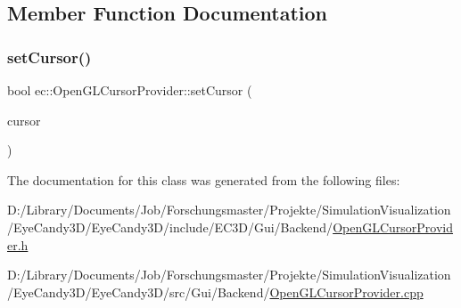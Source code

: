 \subsection{Member Function Documentation}
\mbox{\label{classec_1_1_open_g_l_cursor_provider_a1eadfdfdfeaac9f932bad8e16edfab3b}} 
\subsubsection{\texorpdfstring{set\+Cursor()}{setCursor()}}
{\footnotesize\ttfamily bool ec\+::\+Open\+G\+L\+Cursor\+Provider\+::set\+Cursor (\begin{DoxyParamCaption}\item[{Cursor\+Enum}]{cursor }\end{DoxyParamCaption})\hspace{0.3cm}{\ttfamily [override]}}



The documentation for this class was generated from the following files\+:\begin{DoxyCompactItemize}
\item 
D\+:/\+Library/\+Documents/\+Job/\+Forschungsmaster/\+Projekte/\+Simulation\+Visualization/\+Eye\+Candy3\+D/\+Eye\+Candy3\+D/include/\+E\+C3\+D/\+Gui/\+Backend/\mbox{\hyperlink{_open_g_l_cursor_provider_8h}{Open\+G\+L\+Cursor\+Provider.\+h}}\item 
D\+:/\+Library/\+Documents/\+Job/\+Forschungsmaster/\+Projekte/\+Simulation\+Visualization/\+Eye\+Candy3\+D/\+Eye\+Candy3\+D/src/\+Gui/\+Backend/\mbox{\hyperlink{_open_g_l_cursor_provider_8cpp}{Open\+G\+L\+Cursor\+Provider.\+cpp}}\end{DoxyCompactItemize}

